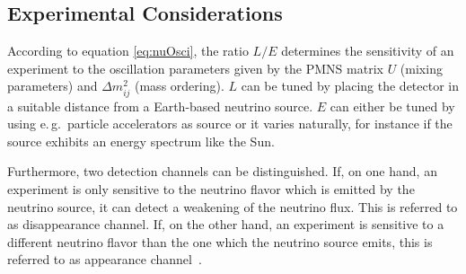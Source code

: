 \subsection{Experimental Considerations}
\label{sec:neutrinoPhysicsOscillationsExpConsiderations}
According to equation \eqref{eq:nuOsci}, the ratio $L/E$ determines the sensitivity of an experiment to the oscillation parameters given by the PMNS matrix $U$ (mixing parameters) and $\Delta m^2_{ij}$ (mass ordering). $L$ can be tuned by placing the detector in a suitable distance from a Earth-based neutrino source. $E$ can either be tuned by using e.\,g.~particle accelerators as source or it varies naturally, for instance if the source exhibits an energy spectrum like the Sun. 

Furthermore, two detection channels can be distinguished. If, on one hand, an experiment is only sensitive to the neutrino flavor which is emitted by the neutrino source, it can detect a weakening of the neutrino flux. This is referred to as disappearance channel. If, on the other hand, an experiment is sensitive to a different neutrino flavor than the one which the neutrino source emits, this is referred to as appearance channel~\cite{zuber2011neutrino}.

